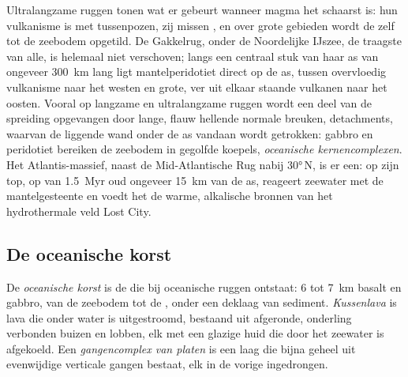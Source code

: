 Ultralangzame ruggen tonen wat er gebeurt wanneer magma het schaarst is: hun vulkanisme is met tussenpozen, zij missen , en over grote gebieden wordt de  zelf tot de zeebodem opgetild. De Gakkelrug, onder de Noordelijke IJszee, de traagste van alle, is helemaal niet verschoven; langs een centraal stuk van haar as van ongeveer \qty{300}{km} lang ligt mantelperidotiet direct op de as, tussen overvloedig vulkanisme naar het westen en grote, ver uit elkaar staande vulkanen naar het oosten. Vooral op langzame en ultralangzame ruggen wordt een deel van de spreiding opgevangen door lange, flauw hellende normale breuken, detachments, waarvan de liggende wand onder de as vandaan wordt getrokken: gabbro en peridotiet bereiken de zeebodem in gegolfde koepels, \emph{oceanische kernencomplexen}. Het Atlantis-massief, naast de Mid-Atlantische Rug nabij \ang{30}\,N, is er een: op zijn top, op  van \qty{1.5}{Myr} oud ongeveer \qty{15}{km} van de as, reageert zeewater met de mantelgesteente en voedt het de warme, alkalische bronnen van het hydrothermale veld Lost City.

\subsection*{De oceanische korst}

\begin{definition}\label{def:b1:rifts-ridges-margins:oceanic-crust}
De \emph{oceanische korst} is de  die bij oceanische ruggen ontstaat: 6 tot \qty{7}{km} basalt en gabbro, van de zeebodem tot de , onder een deklaag van sediment. \emph{Kussenlava} is lava die onder water is uitgestroomd, bestaand uit afgeronde, onderling verbonden buizen en lobben, elk met een glazige huid die door het zeewater is afgekoeld. Een \emph{gangencomplex van platen} is een laag die bijna geheel uit evenwijdige verticale gangen bestaat, elk in de vorige ingedrongen.
\end{definition}

